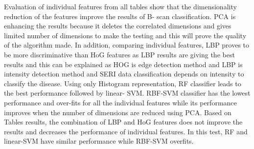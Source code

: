 Evaluation of individual features from all tables show that the dimensionality reduction of the features improve the results of B- scan classification.
PCA is enhancing the results because it deletes the correlated dimensions and gives limited number of dimensions to make the testing and this will prove the quality of the algorithm made.
In addition, comparing individual features, LBP proves to be more discriminative than HoG features as LBP results are giving the best results and this can be explained as HOG is edge detection method and LBP is intensity detection method and SERI data classification depends on intensity to classify the disease.
Using only Histogram representation, RF classifier leads to the best performance followed by linear- SVM. RBF-SVM classifier has the lowest performance and over-fits for all the individual features while its performance improves when the number of dimensions are reduced using PCA.
Based on Tables results, the combination of LBP and HoG features does not improve the results and decreases the performance of individual features.
In this test, RF and linear-SVM have similar performance while RBF-SVM overfits.

